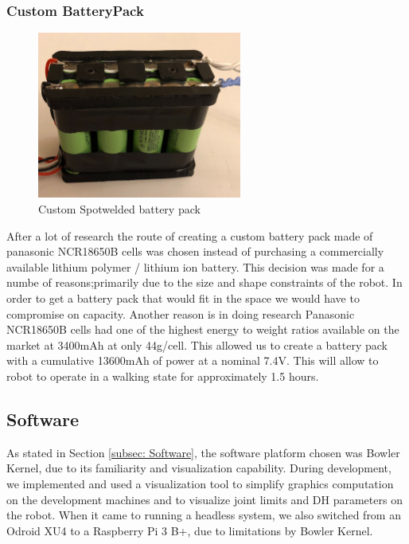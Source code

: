 \subsubsection{Custom BatteryPack}
\begin{figure}[H]
       \centering
       \includegraphics[width=0.6\textwidth]{figures/CustomBatteryPack.jpg}
       \caption{Custom Spotwelded battery pack}
       \label{fig:CustomBatteryPack}
   \end{figure}
   After a lot of research the route of creating a custom battery pack made of panasonic NCR18650B cells was chosen instead of purchasing a commercially available lithium polymer / lithium ion battery. This decision was made for a numbe of reasons;primarily due to the size and shape constraints of the robot. In order to get a battery pack that would fit in the space we would have to compromise on capacity. Another reason is in doing research Panasonic NCR18650B cells had one of the highest energy to weight ratios available on the market at 3400mAh at only 44g/cell. This allowed us to create a battery pack with a cumulative 13600mAh of power at a nominal 7.4V. This will allow to robot to operate in a walking state for approximately 1.5 hours.

\subsection{Software}
    As stated in Section \ref{subsec: Software}, the software platform chosen was Bowler Kernel, due to its familiarity and visualization capability. During development, we implemented and used a visualization tool to simplify graphics computation on the development machines and to visualize joint limits and DH parameters on the robot. When it came to running a headless system, we also switched from an Odroid XU4 to a Raspberry Pi 3 B+, due to limitations by Bowler Kernel. 
    
